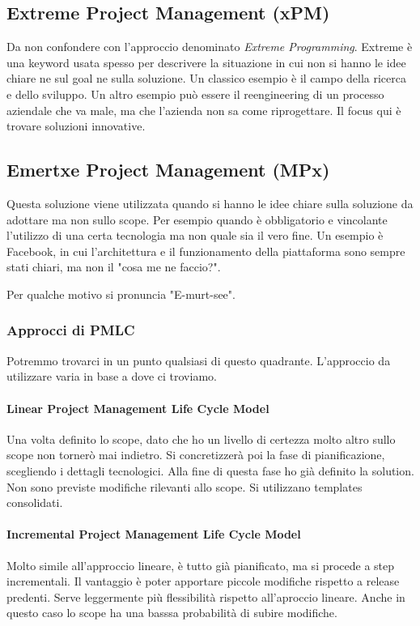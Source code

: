 \subsection{Extreme Project Management (xPM)}
Da non confondere con l'approccio denominato \textit{Extreme Programming}. Extreme è una keyword usata spesso per descrivere la situazione in cui non si hanno le idee chiare ne sul goal ne sulla soluzione. Un classico esempio è il campo della ricerca e dello sviluppo. Un altro esempio può essere il reengineering di un processo aziendale che va male, ma che l'azienda non sa come riprogettare. Il focus qui è trovare soluzioni innovative.
\subsection{Emertxe Project Management (MPx)}
Questa soluzione viene utilizzata quando si hanno le idee chiare sulla soluzione da adottare ma non sullo scope. Per esempio quando è obbligatorio e vincolante l'utilizzo di una certa tecnologia ma non quale sia il vero fine. Un esempio è Facebook, in cui l'architettura e il funzionamento della piattaforma sono sempre stati chiari, ma non il "cosa me ne faccio?".
\begin{info}
	Per qualche motivo si pronuncia "E-murt-see".
\end{info}
\subsubsection{Approcci di PMLC}
Potremmo trovarci in un punto qualsiasi di questo quadrante. L'approccio da utilizzare varia in base a dove ci troviamo.
\paragraph{Linear Project Management Life Cycle Model}
Una volta definito lo scope, dato che ho un livello di certezza molto altro sullo scope non tornerò mai indietro. Si concretizzerà poi la fase di pianificazione, scegliendo i dettagli tecnologici. Alla fine di questa fase ho già definito la solution. Non sono previste modifiche rilevanti allo scope. Si utilizzano templates consolidati.
\paragraph{Incremental Project Management Life Cycle Model}
Molto simile all'approccio lineare, è tutto già pianificato, ma si procede a step incrementali. Il vantaggio è poter apportare piccole modifiche rispetto a release predenti. Serve leggermente più flessibilità rispetto all'aproccio lineare. Anche in questo caso lo scope ha una basssa probabilità di subire modifiche.
